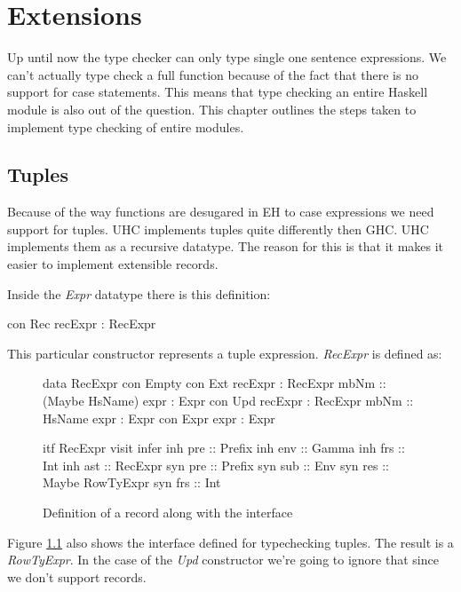 \chapter{Extensions}
\label{cap:Extensions}
Up until now the type checker can only type single one sentence expressions. We can't actually type check a full function because of the fact that there is no support for case statements. This means that type checking an entire Haskell module is also out of the question. This chapter outlines the steps taken to implement type checking of entire modules.
\section{Tuples}
Because of the way functions are desugared in EH to case expressions we need support for tuples. UHC implements tuples quite differently then GHC. UHC implements them as a recursive datatype. The reason for this is that it makes it easier to implement extensible records.

Inside the \emph{Expr} datatype there is this definition:
\begin{code}
  con Rec
    recExpr       :  RecExpr
\end{code}

This particular constructor represents a tuple expression. \emph{RecExpr} is defined as:

\begin{figure}[H]
\begin{minipage}[t]{0.5\linewidth}
\begin{code}
data RecExpr
  con Empty
  con Ext
    recExpr     :  RecExpr
    mbNm        :: (Maybe HsName)
    expr        :  Expr
  con Upd
    recExpr     :  RecExpr
    mbNm        :: HsName
    expr        :  Expr
  con Expr
    expr        :  Expr
\end{code}
\end{minipage}
\begin{minipage}[t]{0.5\linewidth}
\begin{code}
itf RecExpr
  visit infer
    inh pre :: Prefix
    inh env :: Gamma
    inh frs :: Int
    inh ast :: RecExpr
    syn pre :: Prefix
    syn sub :: Env
    syn res :: Maybe RowTyExpr
    syn frs :: Int 
\end{code}
\end{minipage}
\label{record}
\caption{Definition of a record along with the interface}
\end{figure}
Figure \ref{record} also shows the interface defined for typechecking tuples. The result is a \emph{RowTyExpr}. In the case of the \emph{Upd} constructor we're going to ignore that since we don't support records.

